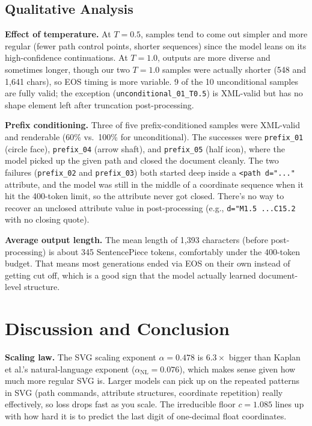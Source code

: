 \documentclass[10pt,letterpaper]{article}
\begin{document}
\subsection{Qualitative Analysis}

\textbf{Effect of temperature.}
At $T = 0.5$, samples tend to come out simpler and more regular (fewer path control points, shorter sequences) since the model leans on its high-confidence continuations. At $T = 1.0$, outputs are more diverse and sometimes longer, though our two $T = 1.0$ samples were actually shorter (548 and 1,641 chars), so EOS timing is more variable. 9 of the 10 unconditional samples are fully valid; the exception (\texttt{unconditional\_01\_T0.5}) is XML-valid but has no shape element left after truncation post-processing.

\textbf{Prefix conditioning.}
Three of five prefix-conditioned samples were XML-valid and renderable (60\% vs.\ 100\% for unconditional). The successes were \texttt{prefix\_01} (circle face), \texttt{prefix\_04} (arrow shaft), and \texttt{prefix\_05} (half icon), where the model picked up the given path and closed the document cleanly. The two failures (\texttt{prefix\_02} and \texttt{prefix\_03}) both started deep inside a \texttt{<path d="..."} attribute, and the model was still in the middle of a coordinate sequence when it hit the 400-token limit, so the attribute never got closed. There's no way to recover an unclosed attribute value in post-processing (e.g., \texttt{d="M1.5 ...C15.2} with no closing quote).

\textbf{Average output length.}
The mean length of 1,393 characters (before post-processing) is about 345 SentencePiece tokens, comfortably under the 400-token budget. That means most generations ended via EOS on their own instead of getting cut off, which is a good sign that the model actually learned document-level structure.

\section{Discussion and Conclusion}
\label{sec:conclusion}

\textbf{Scaling law.}
The SVG scaling exponent $\alpha = 0.478$ is $6.3\times$ bigger than Kaplan et al.'s natural-language exponent ($\alpha_\text{NL} = 0.076$), which makes sense given how much more regular SVG is. Larger models can pick up on the repeated patterns in SVG (path commands, attribute structures, coordinate repetition) really effectively, so loss drops fast as you scale. The irreducible floor $c = 1.085$ lines up with how hard it is to predict the last digit of one-decimal float coordinates.
\end{document}
